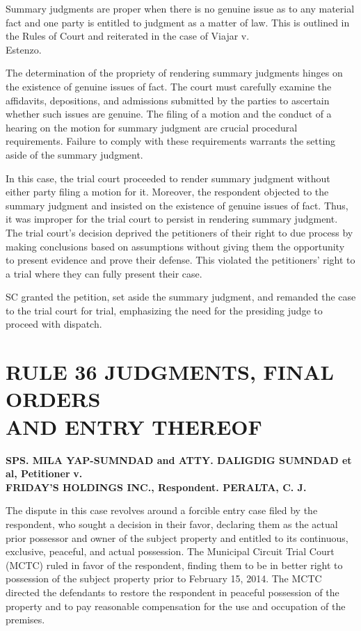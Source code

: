 \documentclass[
12pt,
oneside,
onehalfspacing,
headsepline
]{DigestCollection}
\begin{document}
Summary judgments are proper when there is no genuine issue as to any material fact and one party is entitled to judgment as a matter of law. This is outlined in the Rules of Court and reiterated in the case of Viajar v. \\Estenzo.

The determination of the propriety of rendering summary judgments hinges on the existence of genuine issues of fact. The court must carefully examine the affidavits, depositions, and admissions submitted by the parties to ascertain whether such issues are genuine. The filing of a motion and the conduct of a hearing on the motion for summary judgment are crucial procedural requirements. Failure to comply with these requirements warrants the setting aside of the summary judgment.

In this case, the trial court proceeded to render summary judgment without either party filing a motion for it. Moreover, the respondent objected to the summary judgment and insisted on the existence of genuine issues of fact. Thus, it was improper for the trial court to persist in rendering summary judgment. The trial court's decision deprived the petitioners of their right to due process by making conclusions based on assumptions without giving them the opportunity to present evidence and prove their defense. This violated the petitioners' right to a trial where they can fully present their case.

SC granted the petition, set aside the summary judgment, and remanded the case to the trial court for trial, emphasizing the need for the presiding judge to proceed with dispatch.

\chapter{RULE 36 JUDGMENTS, FINAL ORDERS\\ AND ENTRY THEREOF }
\label{a9953160-0a16-11ef-932c-63c852f65e48}


\label{a8b39b70-0a4c-11ef-a1a5-03b0bde1fccf}


\noindent\textbf{SPS. MILA YAP-SUMNDAD and ATTY. DALIGDIG SUMNDAD et al}\noindent\textbf{, Petitioner }\noindent\textbf{ v. \\FRIDAY’S HOLDINGS INC., Respondent. PERALTA, C. J.}\vspace{0.4cm}

The dispute in this case revolves around a forcible entry case filed by the respondent, who sought a decision in their favor, declaring them as the actual prior possessor and owner of the subject property and entitled to its continuous, exclusive, peaceful, and actual possession. The Municipal Circuit Trial Court (MCTC) ruled in favor of the respondent, finding them to be in better right to possession of the subject property prior to February 15, 2014. The MCTC directed the defendants to restore the respondent in peaceful possession of the property and to pay reasonable compensation for the use and occupation of the premises.
\end{document}
